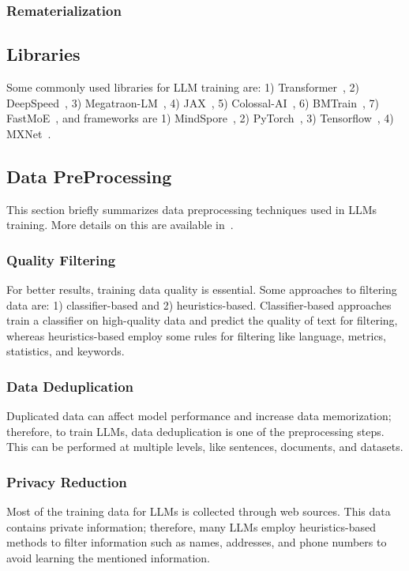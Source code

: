 \subsubsection{Rematerialization}

\subsection{Libraries}
Some commonly used libraries for LLM training are: 1) Transformer~\cite{Lib_Transformers}, 2) DeepSpeed~\cite{Lib_DeepSpeed}, 3) Megatraon-LM~\cite{Lib_Megatron}, 4) JAX~\cite{Lib_Jax}, 5) Colossal-AI~\cite{Lib_Colossal}, 6) BMTrain~\cite{Lib_Bmtrain}, 7) FastMoE~\cite{Lib_Fastmoe}, and frameworks are 1) MindSpore~\cite{Lib_Mindspore}, 2) PyTorch~\cite{Lib_Pytorch}, 3) Tensorflow~\cite{Lib_Tensorflow}, 4) MXNet~\cite{Lib_Mxnet}.  

\subsection{Data PreProcessing}
This section briefly summarizes data preprocessing techniques used in LLMs training. More details on this are available in~\cite{Survey_LLM}.

\subsubsection{Quality Filtering}
For better results, training data quality is essential. Some approaches to filtering data are: 1) classifier-based and 2) heuristics-based. Classifier-based approaches train a classifier on high-quality data and predict the quality of text for filtering, whereas heuristics-based employ some rules for filtering like language, metrics, statistics, and keywords. 

\subsubsection{Data Deduplication}
Duplicated data can affect model performance and increase data memorization; therefore, to train LLMs, data deduplication is one of the preprocessing steps. This can be performed at multiple levels, like sentences, documents, and datasets.

\subsubsection{Privacy Reduction}
Most of the training data for LLMs is collected through web sources. This data contains private information; therefore, many LLMs employ heuristics-based methods to filter information such as names, addresses, and phone numbers to avoid learning the mentioned information.

